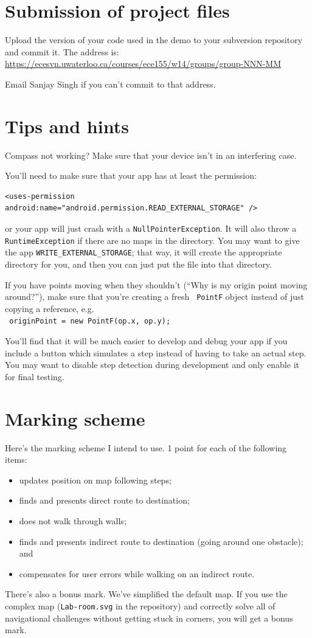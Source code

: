 \documentclass[10pt]{article}
\begin{document}
\section{Submission of project files}

Upload the version of your code used in the demo to your subversion repository and commit it. The address is:
\url{https://ecesvn.uwaterloo.ca/courses/ece155/w14/groups/group-NNN-MM}

Email Sanjay Singh if you can't commit to that address.

\section{Tips and hints} 
Compass not working? Make sure that your device isn't in an interfering case.

You'll need to make sure that your app has at least the permission:
\begin{lstlisting}
<uses-permission android:name="android.permission.READ_EXTERNAL_STORAGE" />
\end{lstlisting}
or your app will just crash with a {\tt NullPointerException}. It will also throw a {\tt RuntimeException} if there are no maps in the directory. You may want
to give the app {\tt WRITE\_EXTERNAL\_STORAGE}; that way, it will create 
the appropriate directory for you, and then you can just put the file into that
directory.

If you have points moving when they shouldn't (``Why is my origin
point moving around?''), make sure that you're creating a fresh {\tt
  PointF} object instead of just copying a reference, e.g.  \\ {\tt
  originPoint = new PointF(op.x, op.y); }



You'll find that it will be much easier to develop and
debug your app if you include a button which simulates a step instead
of having to take an actual step. You may want to disable step
detection during development and only enable it for final testing.

\section{Marking scheme} Here's the marking scheme I intend to use. 1 point for each of the following items:
\begin{itemize}
\item updates position on map following steps;
\item finds and presents direct route to destination;
\item does not walk through walls;
\item finds and presents indirect route to destination (going around one obstacle); and
\item compensates for user errors while walking on an indirect route.
\end{itemize}
There's also a bonus mark. We've simplified the default map. If you
use the complex map ({\tt Lab-room.svg} in the repository)
and correctly solve all of navigational challenges without getting
stuck in corners, you will get a bonus mark.
\end{document}
